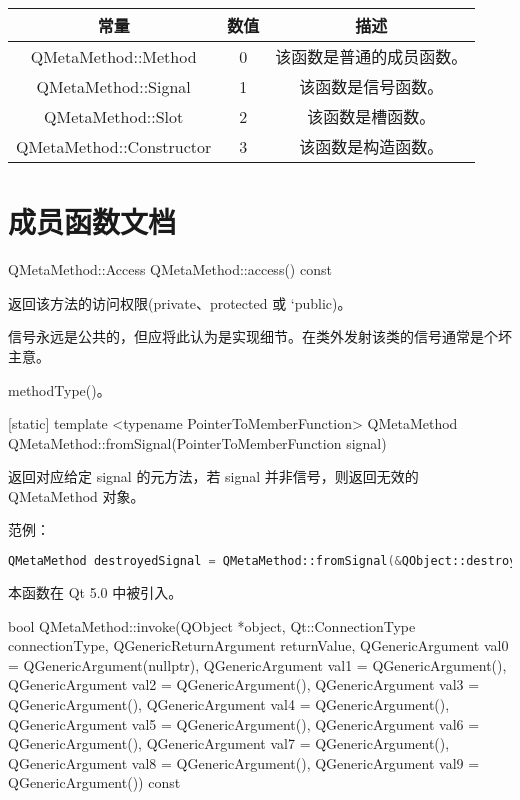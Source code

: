 \begin{tabular}{|c|c|c|}
	\hline
	常量  &	数值 	& 描述  \\ 
	\hline
	QMetaMethod::Method &	0 &	该函数是普通的成员函数。 \\
	\hline
	QMetaMethod::Signal &	1 	&该函数是信号函数。 \\
	\hline
	QMetaMethod::Slot &	2 &	该函数是槽函数。 \\ 
	\hline
	QMetaMethod::Constructor &	3 &	该函数是构造函数。 \\ 
	\hline
	\end{tabular}

\section{成员函数文档}

QMetaMethod::Access QMetaMethod::access() const

返回该方法的访问权限(private、protected 或 `public)。

\begin{notice}
信号永远是公共的，但应将此认为是实现细节。在类外发射该类的信号通常是个坏主意。
\end{notice}

\begin{seeAlso}
methodType()。
\end{seeAlso}

[static] template <typename PointerToMemberFunction> QMetaMethod QMetaMethod::fromSignal(PointerToMemberFunction signal)

返回对应给定 signal 的元方法，若 signal 并非信号，则返回无效的 QMetaMethod 对象。

范例：

\begin{lstlisting}[language=C++]
QMetaMethod destroyedSignal = QMetaMethod::fromSignal(&QObject::destroyed);
\end{lstlisting}


本函数在 Qt 5.0 中被引入。

bool QMetaMethod::invoke(QObject *object, Qt::ConnectionType connectionType, QGenericReturnArgument returnValue, 
   QGenericArgument val0 = QGenericArgument(nullptr), 
   QGenericArgument val1 = QGenericArgument(), 
QGenericArgument val2 = QGenericArgument(), 
QGenericArgument val3 = QGenericArgument(), 
QGenericArgument val4 = QGenericArgument(), 
QGenericArgument val5 = QGenericArgument(), 
QGenericArgument val6 = QGenericArgument(), 
QGenericArgument val7 = QGenericArgument(),
 QGenericArgument val8 = QGenericArgument(), 
 QGenericArgument val9 = QGenericArgument()) const

